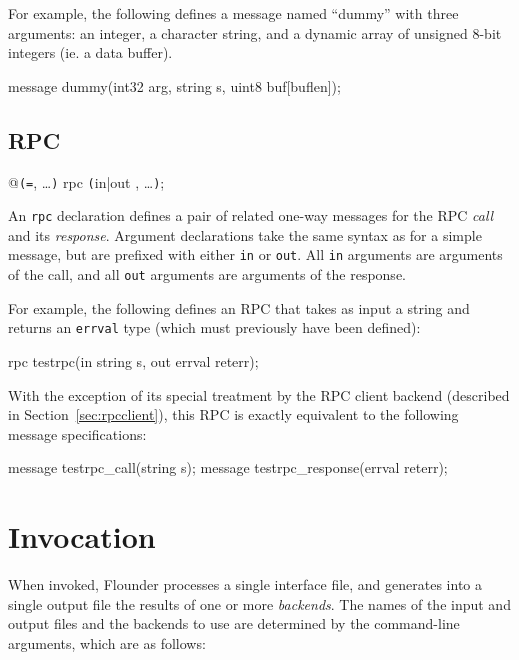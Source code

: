 \documentclass[a4paper,twoside]{report} %
\begin{document}
For example, the following defines a message named ``dummy'' with three
arguments: an integer, a character string, and a dynamic array of unsigned 8-bit
integers (ie. a data buffer).

\begin{example}
  message dummy(int32 arg, string s, uint8 buf[buflen]);
\end{example}

\subsection{RPC}\label{sec:lang:rpc}

\begin{syntax}
@\verb+(+\verb+=+, \ldots \verb+)+ 
rpc  \verb+(+in|out , \ldots \verb+)+;
\end{syntax}

An \texttt{rpc} declaration defines a pair of related one-way messages for the
RPC \emph{call} and its \emph{response}. Argument declarations take the same
syntax as for a simple message, but are prefixed with either \texttt{in} or
\texttt{out}. All \texttt{in} arguments are arguments of the call, and all
\texttt{out} arguments are arguments of the response.

For example, the following defines an RPC that takes as input a string
and returns an \texttt{errval} type (which must previously have been defined):

\begin{example}
  rpc testrpc(in string s, out errval reterr);
\end{example}

With the exception of its special treatment by the RPC client backend
(described in Section~\ref{sec:rpcclient}), this RPC is exactly equivalent
to the following message specifications:

\begin{example}
  message testrpc_call(string s);
  message testrpc_response(errval reterr);
\end{example}

\section{Invocation}

When invoked, Flounder processes a single interface file, and generates into a
single output file the results of one or more \emph{backends}. The names of the
input and output files and the backends to use are determined by the
command-line arguments, which are as follows:
\end{document}
